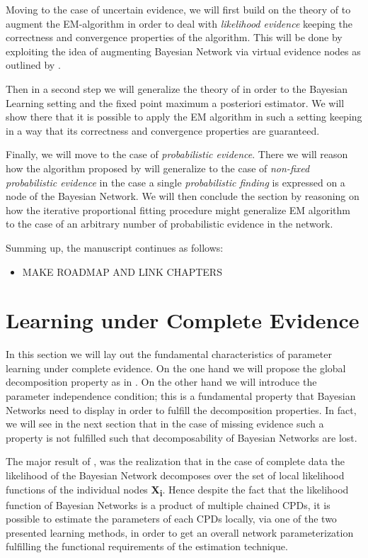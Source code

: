 \documentclass[11pt]{article}
\begin{document}
\begin{article}
Moving to the case of uncertain evidence, we will first build on
the theory of \cite{Wasserkrug_all} to augment the EM-algorithm in
order to deal with \emph{likelihood evidence} keeping the correctness
and convergence properties of the algorithm. This will be done by
exploiting the idea of augmenting Bayesian Network via virtual
evidence nodes as outlined by \cite{pearl2014probabilistic}.

Then in a second step we will generalize the theory of
\cite{Wasserkrug_all} in order to the Bayesian Learning setting and
the fixed point maximum a posteriori estimator. We will show there
that it is possible to apply the EM algorithm in such a setting
keeping in a way that its correctness and convergence properties
are guaranteed.

Finally, we will move to the case of \emph{probabilistic
evidence}. There we will reason how the algorithm proposed by
\cite{Wasserkrug_all} will generalize to the case of \emph{non-fixed
probabilistic evidence} in the case a single \emph{probabilistic
finding} is expressed on a node of the Bayesian Network. We will
then conclude the section by reasoning on how the iterative
proportional fitting procedure might generalize EM algorithm to the
case of an arbitrary number of probabilistic evidence in the
network.

Summing up, the manuscript continues as follows:

\begin{itemize}
\item MAKE ROADMAP AND LINK CHAPTERS
\end{itemize}


\section{Learning under Complete Evidence}
\label{complete-learning}
In this section we will lay out the fundamental characteristics of
parameter learning under complete evidence. On the one hand we will
propose the global decomposition property as in
\cite{spiegelhalter1990sequential}. On the other hand we will
introduce the parameter independence condition; this is a
fundamental property that Bayesian Networks need to display in order
to fulfill the decomposition properties. In fact, we will see in the
next section that in the case of missing evidence such a property is
not fulfilled such that decomposability of Bayesian Networks are
lost.

The major result of \cite{spiegelhalter1990sequential}, was the
realization that in the case of complete data the likelihood of the
Bayesian Network decomposes over the set of local likelihood
functions of the individual nodes \textbf{X\textsubscript{i}}. Hence despite the fact that
the likelihood function of Bayesian Networks is a product of
multiple chained CPDs, it is possible to estimate the parameters of
each CPDs locally, via one of the two presented learning methods, in
order to get an overall network parameterization fulfilling the
functional requirements of the estimation technique.


\end{article}
\end{document}
